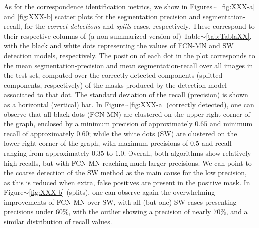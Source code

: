 \documentclass[a4paper,authoryear,review]{elsarticle}
\begin{document}
	As for the correspondence identification metrics, we show in Figures$\sim$ \ref{fig:XXX-a} and \ref{fig:XXX-b} scatter plots for the segmentation precision and segmentation-recall, for the \emph{correct detections} and \emph{splits} cases, respectively. These correspond to their respective columns of (a non-summarized version of) Table$\sim$\ref{tab:TablaXX}, with the black and white dots representing the values of FCN-MN and SW detection models, respectively. The position of each dot in the plot corresponds to the mean segmentation-precision and mean segmentation-recall over all images in the test set, computed over the correctly detected components (splitted components, respectively) of the masks produced by the detection model associated to that dot. The standard deviation of the recall (precision) is shown as a horizontal (vertical) bar.
	In Figure$\sim$\ref{fig:XXX-a} (correctly detected), one can observe that all black dots (FCN-MN) are clustered on the upper-right corner of the graph, enclosed by a minimum precision of approximately $0.65$ and minimum recall of approximately $0.60$; while the white dots (SW) are clustered on the lower-right corner of the graph, with maximum precisions of $0.5$ and recall ranging from approximately $0.35$ to $1.0$. Overall, both algorithms show relatively high recalls, but with FCN-MN reaching much larger precisions. We can point to the coarse detection of the SW method as the main cause for the low precision, as this is reduced when extra, false positives are present in the positive mask. 
	In Figure$\sim$\ref{fig:XXX-b} (splits), one can observe again the overwhelming improvements of FCN-MN over SW, with all (but one) SW cases presenting precisions under $60\%$, with the outlier showing a precision of nearly  $70\%$, and a similar distribution of recall values.  
	
\end{document}
